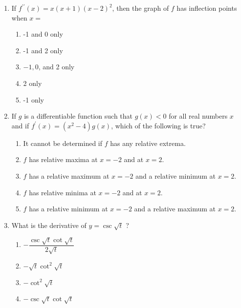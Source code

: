 \documentclass{article}
\begin{document}
\begin{enumerate}
	\item
	\begin{minipage}[t]{\linewidth}
		If \(f^{\prime \prime}(x)=x(x+1)(x-2)^{2}\), then the graph of \(f\) has
inflection points when \(x=\)
\vspace{1em}
		\begin{enumerate}
		\itemsep1em
			\item -1 and 0 only
			\item -1 and 2 only
			\item \(-1,0\), and 2 only
			\item 2 only
			\item -1 only
		\end{enumerate}
	\end{minipage}
	\item
	\begin{minipage}[t]{\linewidth}
		If \(g\) is a differentiable function such that \(g(x)<0\) for all real
numbers \(x\) and if \(f^{\prime}(x)=\left(x^{2}-4\right) g(x)\), which
of the following is true?
\vspace{1em}
		\begin{enumerate}
		\itemsep1em
			\item It cannot be determined if \(f\) has any relative extrema.
			\item \({f}\) has relative maxima at \({x}=-2\) and at \({x}=2\).
			\item \({f}\) has a relative maximum at \({x}=-2\) and a relative minimum at
\({x}=2\).
			\item \({f}\) has relative minima at \({x}=-2\) and at \({x}=2\).
			\item \({f}\) has a relative minimum at \({x}=-2\) and a relative maximum at
\({x}=2\).
		\end{enumerate}
	\end{minipage}
	\item
	\begin{minipage}[t]{\linewidth}
		What is the derivative of \({y}=\csc \sqrt{{t}}\) ?
\vspace{1em}
		\begin{enumerate}
		\itemsep1em
			\item \(-\dfrac{\csc \sqrt{t} \cot \sqrt{t}}{2 \sqrt{t}}\)
			\item \(-\sqrt{t} \cot ^{2} \sqrt{t}\)
			\item \(-\cot ^{2} \sqrt{t}\)
			\item \(-\csc \sqrt{t} \cot \sqrt{t}\)
		\end{enumerate}
	\end{minipage}

\end{enumerate}
\end{document}
